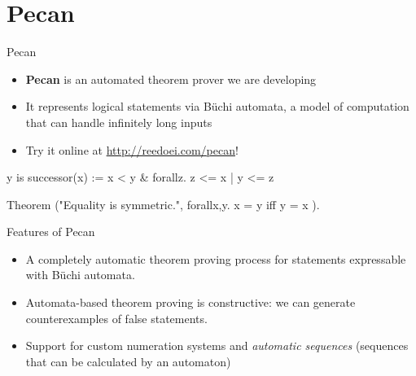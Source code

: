\documentclass[leqno,presentation,usenames,dvipsnames]{beamer}
\begin{document}
\section{Pecan}
\begin{frame}[fragile]{Pecan}

\begin{itemize}
    \item \textbf{Pecan} is an automated theorem prover we are developing
    \item It represents logical statements via B\"uchi automata, a model of computation that can handle infinitely long inputs
    \item Try it online at \url{http://reedoei.com/pecan}!
\end{itemize}
    
\begin{pecan}
y is successor(x) := x < y & forallz. z <= x | y <= z
\end{pecan}

\begin{pecan}
Theorem ("Equality is symmetric.", { 
    forallx,y. x = y iff y = x 
}).
\end{pecan}
\end{frame}

\begin{frame}{Features of Pecan}
    \begin{itemize}
        \item A completely automatic theorem proving process for statements expressable with B\"uchi automata.
        \item Automata-based theorem proving is constructive: we can generate counterexamples of false statements.
        \item Support for custom numeration systems and \emph{automatic sequences} (sequences that can be calculated by an automaton)
    \end{itemize}
\end{frame}
\end{document}
